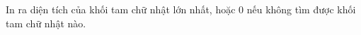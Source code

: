In ra diện tích của khối tam chữ nhật lớn nhất, hoặc 0 nếu không tìm được khối tam chữ nhật nào.  

\